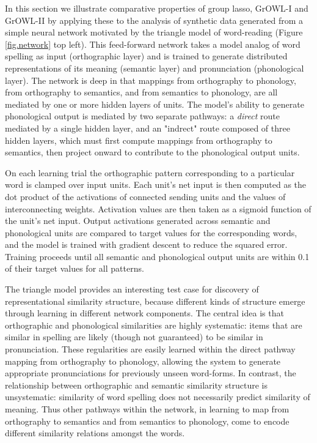 In this section we illustrate comparative properties of group lasso, GrOWL-I and GrOWL-II
by applying these to the analysis of synthetic data generated from a simple neural network
motivated by the triangle model of word-reading (Figure \ref{fig.network} top left). This
feed-forward network takes a model analog of word spelling as input (orthographic layer)
and is trained to generate distributed representations of its meaning (semantic layer) and
pronunciation (phonological layer). The network is deep in that mappings from orthography
to phonology, from orthography to semantics, and from semantics to phonology, are all
mediated by one or more hidden layers of units. The model's ability to generate
phonological output is mediated by two separate pathways: a {\em direct} route mediated by
a single hidden layer, and an "indrect" route composed of three hidden layers, which must
first compute mappings from orthography to semantics, then project onward to contribute to
the phonological output units.

On each learning trial the orthographic pattern corresponding to a particular word is
clamped over input units. Each unit's net input is then computed as the dot product of the
activations of connected sending units and the values of interconnecting weights.
Activation values are then taken as a sigmoid function of the unit's net input. Output
activations generated across semantic and phonological units are compared to target values
for the corresponding words, and the model is trained with gradient descent to reduce the
squared error. Training proceeds until all semantic and phonological output units are
within 0.1 of their target values for all patterns. 

The triangle model provides an interesting test case for discovery of representational
similarity structure, because different kinds of structure emerge through learning in
different network components. The central idea is that orthographic and phonological
similarities are highly systematic: items that are similar in spelling are likely (though
not guaranteed) to be similar in pronunciation. These regularities are easily learned
within the direct pathway mapping from orthography to phonology, allowing the system to
generate appropriate pronunciations for previously unseen word-forms. In contrast, the
relationship between orthographic and semantic similarity structure is unsystematic:
similarity of word spelling does not necessarily predict similarity of meaning. Thus other
pathways within the network, in learning to map from orthography to semantics and from
semantics to phonology, come to encode different similarity relations amongst the
words\cite{PlautETAL96,HarmSeidenberg04}.

